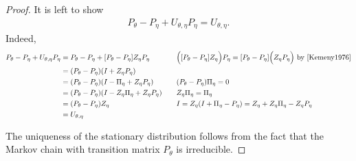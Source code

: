 \documentclass[11pt]{article}
\theoremstyle{definition}
\numberwithin{equation}{section}
\begin{document}
\begin{proof}
 It is left  to show 
   \begin{align}\label{eq:Pfinite}
   P_{\theta}- P_{\eta} + U_{\theta, \eta}  P_{\eta} = U_{\theta, \eta}.
    \end{align} 
   Indeed,   
      \begin{equation*} 
\begin{aligned}[c]
   P_{\theta}- P_{\eta} + U_{\theta, \eta}  P_{\eta}& = P_{\theta}- P_{\eta} +  [P_{\theta} - P_{\eta}] Z_{\eta}   P_{\eta}& \quad &          \Big([P_{\theta} - P_{\eta}] Z_{\eta} \Big)  P_{\eta} =     [P_{\theta} - P_{\eta}] \Big(Z_{\eta}  P_{\eta} \Big)    \text{ by \cite[Corollary 1.9]{Kemeny1976}}\\
   & =  (P_{\theta}- P_{\eta} )(I + Z_{\eta}   P_{\eta} )\\
   & = (P_{\theta}- P_{\eta} )(I -\Pi_{\eta} + Z_{\eta}   P_{\eta} ) & \quad &   (P_{\theta}- P_{\eta}) \Pi_{\eta}=0  \\
   & =   (P_{\theta}- P_{\eta} )(I - Z_{\eta}  \Pi_{\eta} + Z_{\eta}   P_{\eta} )    & \quad &      Z_{\eta}  \Pi_{\eta} = \Pi_{\eta}  \\
   & =  (P_{\theta}- P_{\eta} ) Z_{\eta} & \quad &  I = Z_{\eta}(I + \Pi_\eta - P_\eta) = Z_\eta + Z_\eta \Pi_\eta - Z_\eta P_{\eta} \\
   & = U_{\theta, \eta}
\end{aligned}
 \end{equation*}
   
 
The uniqueness of the stationary distribution follows from the fact that the Markov chain with transition matrix $P_{\theta}$ is irreducible.


\end{proof}
\end{document}
